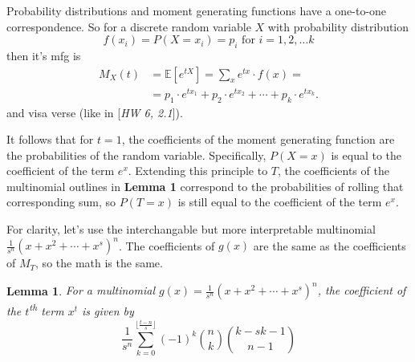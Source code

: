 \documentclass[a4paper]{article}
\newtheorem{lemma}{Lemma}
\begin{document}
Probability distributions and moment generating functions have a one-to-one correspondence. So for a discrete random variable $X$ with probability distribution
%
$$ 
f(x_i) = P(X = x_i) = p_i \text{ for } i = 1, 2, \ldots k 
$$
%
then it's mfg is
%
\begin{align*}
    M_X(t) &= \mathbb{E}[e^{tX}] = \sum_{x} e^{tx} \cdot f(x) =  \\ 
    &= p_1 \cdot e^{tx_1} + p_2 \cdot e^{tx_2} + \cdots + p_k \cdot e^{tx_k}.
\end{align*}
%
and visa verse (like in [\textit{HW 6, 2.1}]).

It follows that for $t = 1$, the coefficients of the moment generating function are the probabilities of the random variable. Specifically, $P(X = x)$ is equal to the coefficient of the term $e^x$. Extending this principle to $T$, the coefficients of the multinomial outlines in \textbf{Lemma 1} correspond to the probabilities of rolling that corresponding sum, so $P(T = x)$ is still equal to the coefficient of the term $e^x$.

For clarity, let's use the interchangable but more interpretable multinomial $\frac{1}{s^n}(x + x^2 + \cdots + x^s)^n$. The coefficients of $g(x)$ are the same as the coefficients of $M_T$, so the math is the same.


\begin{lemma}
    For a multinomial $g(x) = \frac{1}{s^n}(x + x^2 + \cdots + x^s)^n$, the coefficient of the $t$\textsuperscript{th} term $x^t$ is given by
    $$ \frac{1}{s^n} \sum_{k = 0}^{\lfloor\frac{t-n}{s} \rfloor} (-1)^k \binom{n}{k} \binom{k-sk-1}{n-1} $$
\end{lemma}

\end{document}
